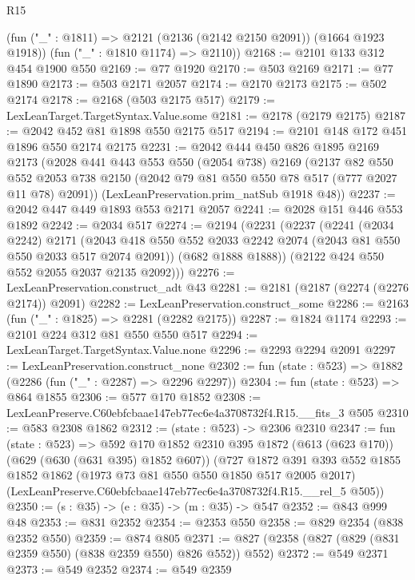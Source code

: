 \begin{lexlean}{R15}
\begin{coremodule}
      (fun ("_" : @1811) => @2121 (@2136 (@2142 @2150 @2091)) (@1664 @1923 @1918))
      (fun ("_" : @1810 @1174) => @2110))
@2168 := @2101 @133 @312 @454 @1900 @550
@2169 := @77 @1920
@2170 := @503 @2169
@2171 := @77 @1890
@2173 := @503 @2171 @2057
@2174 := @2170 @2173
@2175 := @502 @2174
@2178 := @2168 (@503 @2175 @517)
@2179 := LexLeanTarget.TargetSyntax.Value.some
@2181 := @2178 (@2179 @2175)
@2187 := @2042 @452 @81 @1898 @550 @2175 @517
@2194 := @2101 @148 @172 @451 @1896 @550 @2174 @2175
@2231 := @2042
    @444
    @450
    @826
    @1895
    @2169
    @2173
    (@2028
      @441
      @443
      @553
      @550
      (@2054 @738)
      @2169
      (@2137
        @82
        @550
        @552
        @2053
        @738
        @2150
        (@2042 @79 @81 @550 @550 @78 @517 (@777 @2027 @11 @78) @2091))
      (LexLeanPreservation.prim_natSub @1918 @48))
@2237 := @2042 @447 @449 @1893 @553 @2171 @2057
@2241 := @2028 @151 @446 @553 @1892
@2242 := @2034 @517
@2274 := @2194
    (@2231
      (@2237
        (@2241
          (@2034 @2242)
          @2171
          (@2043 @418 @550 @552 @2033 @2242 @2074 (@2043 @81 @550 @550 @2033 @517 @2074 @2091))
          (@682 @1888 @1888))
        (@2122 @424 @550 @552 @2055 @2037 @2135 @2092)))
@2276 := LexLeanPreservation.construct_adt @43
@2281 := @2181 (@2187 (@2274 (@2276 @2174)) @2091)
@2282 := LexLeanPreservation.construct_some
@2286 := @2163 (fun ("_" : @1825) => @2281 (@2282 @2175))
@2287 := @1824 @1174
@2293 := @2101 @224 @312 @81 @550 @550 @517
@2294 := LexLeanTarget.TargetSyntax.Value.none
@2296 := @2293 @2294 @2091
@2297 := LexLeanPreservation.construct_none
@2302 := fun (state : @523) => @1882 (@2286 (fun ("_" : @2287) => @2296 @2297))
@2304 := fun (state : @523) => @864 @1855
@2306 := @577 @170 @1852
@2308 := LexLeanPreserve.C60ebfcbaae147eb77ec6e4a3708732f4.R15.__fits_3 @505
@2310 := @583 @2308 @1862
@2312 := (state : @523) -> @2306 @2310
@2347 := fun (state : @523) =>
  @592
    @170
    @1852
    @2310
    @395
    @1872
    (@613 (@623 @170))
    (@629 (@630 (@631 @395) @1852 @607))
    (@727
      @1872
      @391
      @393
      @552
      @1855
      @1852
      @1862
      (@1973 @73 @81 @550 @550 @1850 @517 @2005 @2017)
      (LexLeanPreserve.C60ebfcbaae147eb77ec6e4a3708732f4.R15.__rel_5 @505))
@2350 := (s : @35) -> (e : @35) -> (m : @35) -> @547
@2352 := @843 @999 @48
@2353 := @831 @2352
@2354 := @2353 @550
@2358 := @829 @2354 (@838 @2352 @550)
@2359 := @874 @805
@2371 := @827 (@2358 (@827 (@829 (@831 @2359 @550) (@838 @2359 @550) @826 @552)) @552)
@2372 := @549 @2371
@2373 := @549 @2352
@2374 := @549 @2359

\end{coremodule}
\end{lexlean}
